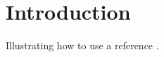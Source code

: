 \documentclass{article}
\begin{document}
\pagebreak


\setcounter{page}{1}

\section{Introduction}
\label{sec:Introduction}

Illustrating how to use a reference \citep{dummy_2020}.

\pagebreak





\clearpage
\end{document}
